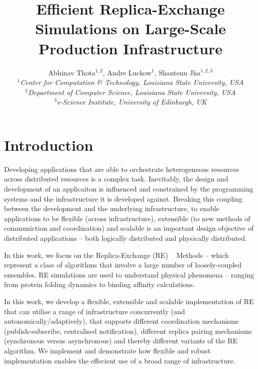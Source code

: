 \documentclass[a4paper,10pt]{article}
\begin{document}
\title{\LARGE Efficient Replica-Exchange Simulations on
  Large-Scale Production Infrastructure}

 

\author{Abhinav Thota$^{1,2}$, Andre Luckow$^{1}$, Shantenu Jha$^{1,2,3}$\\
   \small{\emph{$^{1}$Center for Computation \& Technology, Louisiana State University, USA}}\\
   \small{\emph{$^{2}$Department of Computer Science, Louisiana State University, USA}}\\
   \small{\emph{$^{3}$e-Science Institute, University of Edinburgh, UK}}
   }
 
\maketitle

\section{Introduction}
 
Developing applications that are able to orchestrate heterogeneous
resources across distributed resources is a complex task.  Inevitably,
the design and development of an applicaiton is influenced and
constrained by the programming systems and the infrastructure it is
developed against. Breaking this coupling between the development and
the underlying infrastructure, to enable applications to be flexible
(across infrastructure), extensible (to new methods of communiction
and coordination) and scalable is an important design objective of
distributed applications -- both logically distributed and physically
distributed.

In this work, we focus on the Replica-Exchange (RE)
~\cite{hansmann,Sugita:1999rm} Methods -- which represent a class of
algorithms that involve a large number of loosely-coupled ensembles.
RE simulations are used to understand physical phenomena -- ranging
from protein folding dynamics to binding affinity calculations.

In this work, we develop a flexible, extensible and scalable
implementation of RE that can utilise a range of infrastructure
concurrently (and autonomically/adaptively), that supports different
coordination mechanisms (publish-subscribe, centralised notification),
different replica pairing mechanisms (synchronous versus asynchronous)
and thereby different variants of the RE algorithm. We implement and
demonstrate how flexible and robust implementation enables the
effecient use of a broad range of infrastructure.
\end{document}
